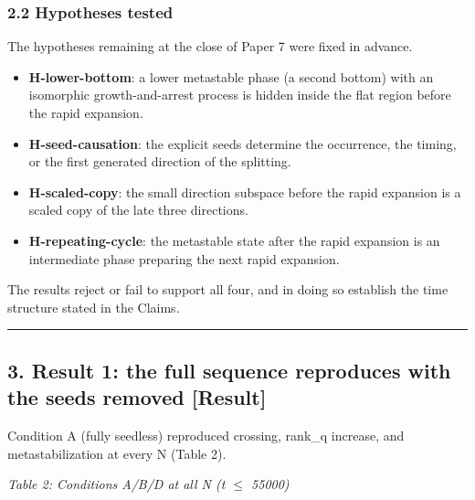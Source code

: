 \documentclass[
  a4paper,
]{article}
\providecommand{\tightlist}{%
  \setlength{\itemsep}{0pt}\setlength{\parskip}{0pt}}
\begin{document}
\subsubsection{2.2 Hypotheses tested}\label{hypotheses-tested}

The hypotheses remaining at the close of Paper 7 were fixed in advance.

\begin{itemize}
\tightlist
\item
  \textbf{H-lower-bottom}: a lower metastable phase (a second bottom)
  with an isomorphic growth-and-arrest process is hidden inside the flat
  region before the rapid expansion.
\item
  \textbf{H-seed-causation}: the explicit seeds determine the
  occurrence, the timing, or the first generated direction of the
  splitting.
\item
  \textbf{H-scaled-copy}: the small direction subspace before the rapid
  expansion is a scaled copy of the late three directions.
\item
  \textbf{H-repeating-cycle}: the metastable state after the rapid
  expansion is an intermediate phase preparing the next rapid expansion.
\end{itemize}

The results reject or fail to support all four, and in doing so
establish the time structure stated in the Claims.

\begin{center}\rule{0.5\linewidth}{0.5pt}\end{center}

\subsection{3. Result 1: the full sequence reproduces with the seeds
removed
{[}Result{]}}\label{result-1-the-full-sequence-reproduces-with-the-seeds-removed-result}

Condition A (fully seedless) reproduced crossing, rank\_q increase, and
metastabilization at every N (Table 2).

\emph{Table 2: Conditions A/B/D at all N (t \(\le\) 55000)}
\end{document}
